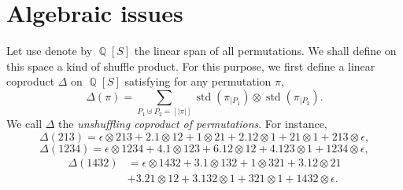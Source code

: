 \documentclass[a4paper,10pt]{llncs}
\DeclareMathOperator{\QQ}{\mathbb{Q}}
\DeclareMathOperator{\STD}{\mathrm{std}}
\begin{document}
\section{Algebraic issues}
\label{section:Algebraic issues}
Let use denote by $\QQ[S]$ the linear span of all permutations. We shall
define on this space a kind of shuffle product. For this purpose, we
first define a linear coproduct $\Delta$ on $\QQ[S]$ satisfying for
any permutation $\pi$,
\begin{equation} \label{equ:unshuffling_coproduct}
    \Delta(\pi) =
    \sum_{P_1 \uplus P_2 = [|\pi|]}
    \STD\left(\pi_{|P_1}\right) \otimes \STD\left(\pi_{|P_2}\right).
\end{equation}
We call $\Delta$ the {\em unshuffling coproduct of permutations}. For
instance,
\begin{equation}
    \Delta(213) =
    \epsilon \otimes 213 + 2. 1 \otimes 12 +
    1 \otimes 21 + 2. 12 \otimes 1 + 21 \otimes 1 + 213 \otimes \epsilon,
\end{equation}
\begin{equation}
    \Delta(1234) =
    \epsilon \otimes 1234 + 4. 1 \otimes 123 + 6. 12 \otimes 12 +
    4. 123 \otimes 1 + 1234 \otimes \epsilon,
\end{equation}
\begin{equation}\begin{split} \label{equ:example_unshuffling_coproduct}
    \Delta(1432) & =
    \epsilon \otimes 1432 + 3. 1 \otimes 132 + 1 \otimes 321 +
    3. 12 \otimes 21 \\ & + 3. 21 \otimes 12 + 3. 132 \otimes 1 +
    321 \otimes 1 + 1432 \otimes \epsilon.
\end{split}\end{equation}
\medskip
\end{document}

